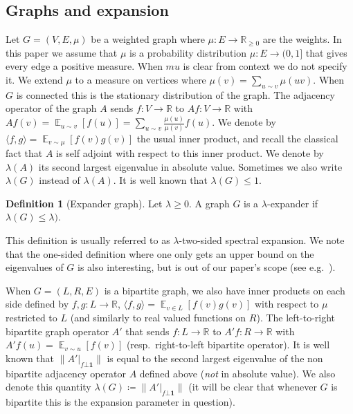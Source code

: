 \documentclass[10pt,a4paper]{article}
\theoremstyle{definition}
\newtheorem{definition}[theorem]{Definition}
\theoremstyle{remark}
\newcommand{\Brac}[1]{\left[#1\right]}
\newcommand{\norm}[1]{\lVert#1\rVert}
\newcommand{\iprod}[1]{\langle#1\rangle}
\newcommand{\Esymb}{\mathbb{E}}
\DeclareMathOperator*{\E}{\Esymb}
\def\one{{\mathbf{1}}}
\newcommand{\Ex}[2][]{\E_{{#1}}\Brac{#2}}
\newcommand{\R}{\mathbb R}
\renewcommand{\leq}{\leqslant}
\renewcommand{\geq}{\geqslant}
\numberwithin{equation}{section}
\begin{document}
\subsection{Graphs and expansion} \label{sec:graph-expansion}
Let \(G=(V,E,\mu)\) be a weighted graph where \(\mu:E \to \R_{\geq 0}\) are the weights. In this paper we assume that \(\mu\) is a probability distribution \(\mu:E \to (0,1]\) that gives every edge a positive measure. When \(mu\) is clear from context we do not specify it. We extend \(\mu\) to a measure on vertices where \(\mu(v) = \sum_{u \sim v}\mu(uv)\). When \(G\) is connected this is the stationary distribution of the graph. The adjacency operator of the graph \(A\) sends \(f:V \to \R\) to \(Af: V \to \R\) with \(Af(v) = \Ex[u \sim v]{f(u)} = \sum_{u \sim v} \frac{\mu(u)}{\mu(v)} f(u)\). We denote by \(\iprod{f,g} = \Ex[v \sim \mu]{f(v)g(v)}\) the usual inner product, and recall the classical fact that \(A\) is self adjoint with respect to this inner product. We denote by \(\lambda(A)\) its second largest eigenvalue in absolute value. Sometimes we also write \(\lambda(G)\) instead of \(\lambda(A)\). It is well known that \(\lambda(G) \leq 1\).

\begin{definition}[Expander graph]
    Let \(\lambda \geq 0\). A graph \(G\) is a \(\lambda\)-expander if \(\lambda(G)\leq \lambda)\).
\end{definition}

This definition is usually referred to as \(\lambda\)-two-sided spectral expansion. We note that the one-sided definition where one only gets an upper bound on the eigenvalues of \(G\) is also interesting, but is out of our paper's scope (see e.g.\ \cite{hoory2006expander}).

When \(G=(L,R,E)\) is a bipartite graph, we also have inner products on each side defined by \(f,g:L \to \R\), \(\iprod{f,g}=\Ex[v \in L]{f(v)g(v)}\) with respect to \(\mu\) restricted to \(L\) (and similarly to real valued functions on \(R\)). The left-to-right bipartite graph operator \(A'\) that sends \(f:L \to \R\) to \(A'f:R \to \R\) with \(A'f(u) = \Ex[v \sim u]{f(v)}\) (resp.\ right-to-left bipartite operator). It is well known that \(\norm{A'|_{f \bot \one}}\) is equal to the second largest eigenvalue of the non bipartite adjacency operator \(A\) defined above (\emph{not} in absolute value). We also denote this quantity \(\lambda(G) \coloneqq \norm{A'|_{f \bot \one}}\) (it will be clear that whenever \(G\) is bipartite this is the expansion parameter in question).
\end{document}
